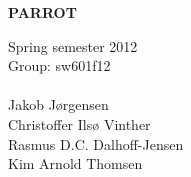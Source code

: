 
\begin{center}


\textbf{\fontsize{35}{70}\selectfont\sffamily PARROT\\ \vspace{1cm}}





\end{center}

\begin{figure}[htb]
\begin{center}
\end{center}
\end{figure}

\huge {Spring semester 2012}\\

\LARGE{Group: sw601f12}
\normalsize \\ \\
Jakob J\o{}rgensen\\
Christoffer Ils\o{} Vinther\\
Rasmus D.C. Dalhoff-Jensen\\
Kim Arnold Thomsen